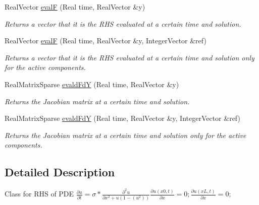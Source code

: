 \begin{DoxyCompactItemize}
\item 
RealVector \hyperlink{classAllenCahnRHSFunction_a88cc6858ebc041f62edf9b3fc0505849}{evalF} (Real time, RealVector \&y)
\begin{DoxyCompactList}\small\item\em Returns a vector that it is the RHS evaluated at a certain time and solution. \item\end{DoxyCompactList}\item 
RealVector \hyperlink{classAllenCahnRHSFunction_a4f2df77dfae069945cc40dc2b1eb0200}{evalF} (Real time, RealVector \&y, IntegerVector \&ref)
\begin{DoxyCompactList}\small\item\em Returns a vector that it is the RHS evaluated at a certain time and solution only for the active components. \item\end{DoxyCompactList}\item 
RealMatrixSparse \hyperlink{classAllenCahnRHSFunction_ac203ad1a188d842e6a9a9e70762b2b30}{evaldFdY} (Real time, RealVector \&y)
\begin{DoxyCompactList}\small\item\em Returns the Jacobian matrix at a certain time and solution. \item\end{DoxyCompactList}\item 
RealMatrixSparse \hyperlink{classAllenCahnRHSFunction_a51d138b3083af6914800d956171dfa6a}{evaldFdY} (Real time, RealVector \&y, IntegerVector \&ref)
\begin{DoxyCompactList}\small\item\em Returns the Jacobian matrix at a certain time and solution only for the active components. \item\end{DoxyCompactList}\end{DoxyCompactItemize}


\subsection{Detailed Description}
Class for RHS of PDE $ \frac{\partial u}{ \partial t} = \sigma * \frac{\partial^{2}u}{\partial x^{2} + u(1-(u^{2}))} \frac{\partial u(x0,t)}{ \partial x} = 0; \frac{\partial u(xL,t)}{ \partial x} = 0; $ 

